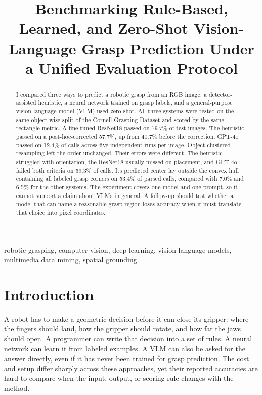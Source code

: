 \documentclass[10pt,conference,compsoc]{IEEEtran}
\title{Benchmarking Rule-Based, Learned, and Zero-Shot Vision-Language Grasp Prediction Under a Unified Evaluation Protocol}
\author{\IEEEauthorblockN{Anish Talla}
\IEEEauthorblockA{\textit{High School Student}\\
United States}}
\begin{document}
\maketitle

\begin{abstract}
I compared three ways to predict a robotic grasp from an RGB image: a
detector-assisted heuristic, a neural network trained on grasp labels, and a
general-purpose vision-language model (VLM) used zero-shot. All three systems
were tested on the same object-wise split of the Cornell Grasping Dataset and
scored by the same rectangle metric. A fine-tuned ResNet18 passed on 79.7\%
of test images. The heuristic passed on a post-hoc-corrected 57.7\%, up from
40.7\% before the correction. GPT-4o passed on 12.4\% of calls across five
independent runs per image. Object-clustered resampling left the order
unchanged. Their errors were different. The heuristic struggled with
orientation, the ResNet18 usually missed on placement, and GPT-4o failed
both criteria on 59.3\% of calls. Its predicted
center lay outside the convex hull containing all labeled grasp corners on 53.4\%
of parsed calls, compared with 7.0\% and 6.5\% for the other systems. The
experiment covers one model and one prompt, so it cannot support a claim
about VLMs in general. A follow-up should test whether a model that can name
a reasonable grasp region loses accuracy when it must translate that choice
into pixel coordinates.
\end{abstract}

\begin{IEEEkeywords}
robotic grasping, computer vision, deep learning, vision-language models,
multimedia data mining, spatial grounding
\end{IEEEkeywords}

\section{Introduction}

A robot has to make a geometric decision before it can close its gripper:
where the fingers should land, how the gripper should rotate, and how far the
jaws should open. A programmer can write that decision into a set of rules. A
neural network can learn it from labeled examples. A VLM can also be asked for
the answer directly, even if it has never been trained for grasp prediction.
The cost and setup differ sharply across these approaches, yet their reported
accuracies are hard to compare when the input, output, or scoring rule changes
with the method.
\end{document}

